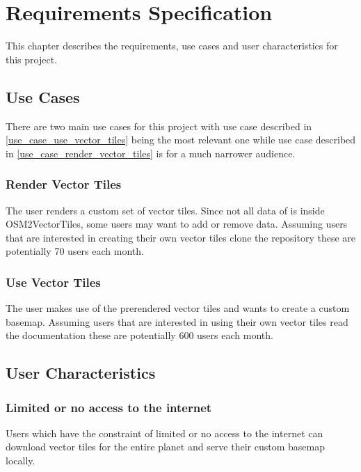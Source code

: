 \chapter{Requirements Specification}\label{requirements_specification}

This chapter describes the requirements, use cases and user characteristics for this project.

\section{Use Cases}\label{use_cases}

There are two main use cases for this project with use case described in \autoref{use_case_use_vector_tiles} being the most relevant one while use case described in \autoref{use_case_render_vector_tiles} is for a much narrower audience.

\subsection{Render Vector Tiles}\label{use_case_render_vector_tiles}

The user renders a custom set of vector tiles. Since not all data of \osm{} is inside OSM2VectorTiles, some users may want to add or remove data. Assuming users that are interested in creating their own vector tiles clone the \osmvt{} repository these are potentially 70 users each month.

\subsection{Use Vector Tiles}\label{use_case_use_vector_tiles}

The user makes use of the prerendered vector tiles and wants to create a custom basemap. Assuming users that are interested in using their own vector tiles read the documentation these are potentially 600 users each month.

\section{User Characteristics}\label{user_characteristics}

\subsection{Limited or no access to the internet}

Users which have the constraint of limited or no access to the internet can download vector tiles for the entire planet and serve their custom basemap locally.

